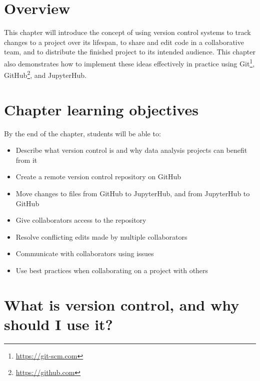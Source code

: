 \documentclass[
]{krantz}
\providecommand{\tightlist}{%
  \setlength{\itemsep}{0pt}\setlength{\parskip}{0pt}}
\renewcommand{\href}[2]{#2\footnote{\url{#1}}}
\begin{document}
\hypertarget{overview-3}{%
\section{Overview}\label{overview-3}}

This chapter will introduce the concept of using version control systems to track changes to a project over
its lifespan, to share and edit code in a collaborative team, and to distribute the finished project to its intended audience.
This chapter also demonstrates how to implement these ideas effectively
in practice using \href{https://git-scm.com}{Git}, \href{https://github.com}{GitHub}, and JupyterHub.

\hypertarget{chapter-learning-objectives-4}{%
\section{Chapter learning objectives}\label{chapter-learning-objectives-4}}

By the end of the chapter, students will be able to:

\begin{itemize}
\tightlist
\item
  Describe what version control is and why data analysis projects can benefit from it
\item
  Create a remote version control repository on GitHub
\item
  Move changes to files from GitHub to JupyterHub, and from JupyterHub to GitHub
\item
  Give collaborators access to the repository
\item
  Resolve conflicting edits made by multiple collaborators
\item
  Communicate with collaborators using issues
\item
  Use best practices when collaborating on a project with others
\end{itemize}

\hypertarget{what-is-version-control-and-why-should-i-use-it}{%
\section{What is version control, and why should I use it?}\label{what-is-version-control-and-why-should-i-use-it}}
\end{document}
